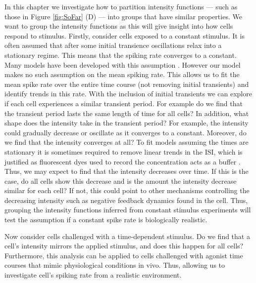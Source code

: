 \documentclass[../main.tex]{subfiles}
\begin{document}
In this chapter we investigate how to partition intensity functions --- such as those in Figure \ref{fig:SoFar} (D) ---  into groups that have similar properties. We want to group the intensity functions as this will give insight into how cells respond to stimulus.
 Firstly, consider cells exposed to a constant stimulus. It is often assumed that after some initial transience  oscillations relax into a stationary regime. This means that the spiking rate converges to a constant. Many models have been developed with this assumption \cite{Skupin_2008, Skupin_2010}. However our model makes no such assumption on the mean spiking rate. This allows us to fit the mean  spike rate over the entire time course (not removing initial transients) and identify trends in this rate. With the inclusion of initial transients we can explore if each cell experiences a similar transient period. For example do we find that the transient period lasts the same length of time for all cells? In addition, what shape does the intensity take in the transient period? For example, the intensity could gradually decrease or oscillate as it converges to a constant. Moreover, do we find that the intensity converges at all? To fit models assuming the  times are stationary it is sometimes required to remove linear trends in the ISI, which is justified as fluorescent dyes used to record the  concentration acts as a  buffer \cite{Thurley_2014}. Thus, we may expect to find that the intensity decreases over time. If this is the case, do all cells show this decrease and is the amount the intensity decrease similar for each cell? If not, this could point to other mechanisms controlling the decreasing intensity such as negative feedback dynamics found in the cell. Thus, grouping the intensity functions inferred from constant stimulus experiments will test the assumption if a constant spike rate is biologically realistic. 

 Now consider cells challenged with a time-dependent stimulus. Do we find that a cell's intensity mirrors the applied stimulus, and does this happen for all cells? Furthermore, this analysis can be applied to cells challenged with agonist time courses that mimic physiological conditions in vivo. Thus, allowing us to investigate cell's spiking rate from a realistic environment.  
\end{document}
